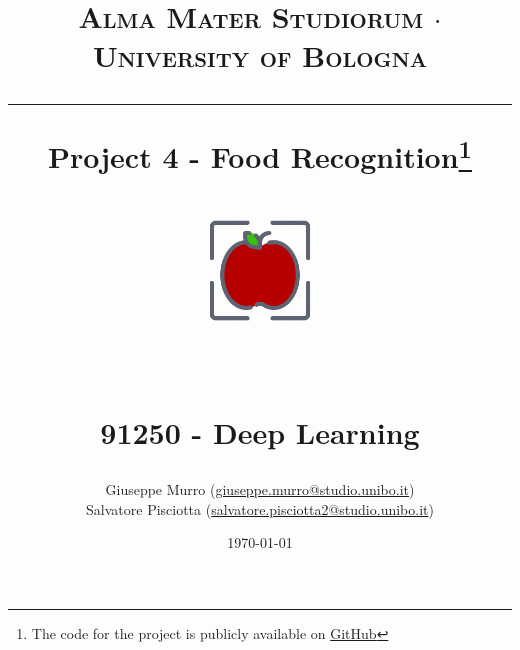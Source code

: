 \documentclass[a4paper,10pt]{report}
\begin{document}
\frenchspacing



\title{
  {{\large{\textsc{Alma Mater Studiorum $\cdot$ University of Bologna}}}}
  \rule{\textwidth}{0.4pt}\vspace{3mm}
  \textbf{Project 4 - Food Recognition\footnote{The code for the project is publicly available on \href{https://github.com/gmurro/FoodRecognition}{GitHub}}}
  \begin{figure}[!htb]
    \centering
    \includegraphics[width = 100pt]{icon}
  \end{figure} \\
   91250 - Deep Learning
}

\author{ Giuseppe Murro (\href{mailto:giuseppe.murro@studio.unibo.it}{giuseppe.murro@studio.unibo.it}) \\ Salvatore Pisciotta (\href{mailto:salvatore.pisciotta2@studio.unibo.it}{salvatore.pisciotta2@studio.unibo.it})}
\date{\today}
\maketitle
\newpage
\tableofcontents
\setcounter{tocdepth}{1}
\newpage
\end{document}
